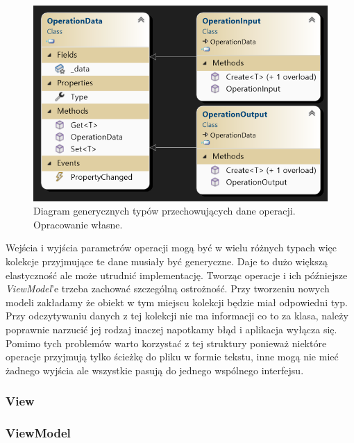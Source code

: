 \begin{figure}[H]
    \centering
    \includegraphics[width=0.6\linewidth]{images/Picture12.png}
    \caption{Diagram generycznych typów przechowujących dane operacji. Opracowanie własne.}
    \label{fig:input}
\end{figure}

Wejścia i wyjścia parametrów operacji mogą być w wielu różnych typach więc kolekcje przyjmujące te dane musiały być generyczne. 
Daje to dużo większą elastyczność ale może utrudnić implementację. 
Tworząc operacje i ich późniejsze \textit{ViewModel}'e trzeba zachować szczególną ostrożność. 
Przy tworzeniu nowych modeli zakładamy że obiekt w tym miejscu kolekcji będzie miał odpowiedni typ. 
Przy odczytywaniu danych z tej kolekcji nie ma informacji co to za klasa, należy poprawnie narzucić jej rodzaj inaczej napotkamy błąd i aplikacja wyłącza się.
Pomimo tych problemów warto korzystać z tej struktury ponieważ niektóre operacje przyjmują tylko ścieżkę do pliku w formie tekstu, inne mogą nie mieć żadnego wyjścia ale wszystkie pasują do jednego wspólnego interfejsu.

\subsubsection{View}



\subsubsection{ViewModel}
